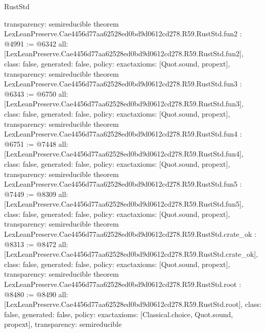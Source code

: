 \begin{lexlean}{RustStd}
\begin{coremodule}
{  transparency: semireducible
}
theorem LexLeanPreserve.Cae4456d77aa62528ed0bd9d0612cd278.R59.RustStd.fun2 : @4991 := @6342 {
  all: [LexLeanPreserve.Cae4456d77aa62528ed0bd9d0612cd278.R59.RustStd.fun2],
  class: false,
  generated: false,
  policy: exact{axioms: [Quot.sound, propext]},
  transparency: semireducible
}
theorem LexLeanPreserve.Cae4456d77aa62528ed0bd9d0612cd278.R59.RustStd.fun3 : @6343 := @6750 {
  all: [LexLeanPreserve.Cae4456d77aa62528ed0bd9d0612cd278.R59.RustStd.fun3],
  class: false,
  generated: false,
  policy: exact{axioms: [Quot.sound, propext]},
  transparency: semireducible
}
theorem LexLeanPreserve.Cae4456d77aa62528ed0bd9d0612cd278.R59.RustStd.fun4 : @6751 := @7448 {
  all: [LexLeanPreserve.Cae4456d77aa62528ed0bd9d0612cd278.R59.RustStd.fun4],
  class: false,
  generated: false,
  policy: exact{axioms: [Quot.sound, propext]},
  transparency: semireducible
}
theorem LexLeanPreserve.Cae4456d77aa62528ed0bd9d0612cd278.R59.RustStd.fun5 : @7449 := @8309 {
  all: [LexLeanPreserve.Cae4456d77aa62528ed0bd9d0612cd278.R59.RustStd.fun5],
  class: false,
  generated: false,
  policy: exact{axioms: [Quot.sound, propext]},
  transparency: semireducible
}
theorem LexLeanPreserve.Cae4456d77aa62528ed0bd9d0612cd278.R59.RustStd.crate_ok : @8313 := @8472 {
  all: [LexLeanPreserve.Cae4456d77aa62528ed0bd9d0612cd278.R59.RustStd.crate_ok],
  class: false,
  generated: false,
  policy: exact{axioms: [Quot.sound, propext]},
  transparency: semireducible
}
theorem LexLeanPreserve.Cae4456d77aa62528ed0bd9d0612cd278.R59.RustStd.root : @8480 := @8490 {
  all: [LexLeanPreserve.Cae4456d77aa62528ed0bd9d0612cd278.R59.RustStd.root],
  class: false,
  generated: false,
  policy: exact{axioms: [Classical.choice, Quot.sound, propext]},
  transparency: semireducible
}


\end{coremodule}
\end{lexlean}

